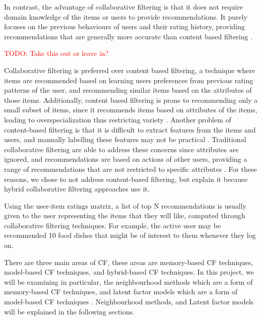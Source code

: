 In contrast, the advantage of collaborative filtering is that it does not require domain knowledge of the items or users to provide recommendations. It purely focuses on the previous behaviours of users and their rating history, providing recommendations that are generally more accurate than content based filtering \cite{koren2009matrix, schafer2007collaborative}. 

\textcolor{red}{TODO: Take this out or leave in?}

Collaborative filtering is preferred over content based filtering, a technique where items are recommended based on learning users preferences from previous rating patterns of the user, and recommending similar items based on the attributes of those items. Additionally, content based filtering is prone to recommending only a small subset of items, since it recommends items based on attributes of the items, leading to overspecialization thus restricting variety \cite{toward}. Another problem of content-based filtering is that it is difficult to extract features from the items and users, and manually labelling these features may not be practical \cite{toward}. Traditional collaborative filtering are able to address these concerns since attributes are ignored, and recommendations are based on actions of other users, providing a range of recommendations that are not restricted to specific attributes \cite{koren2009matrix}. For these reasons, we chose to not address content-based filtering, but explain it because hybrid collaborative filtering approaches use it. 

Using the user-item ratings matrix, a list of top N recommendations is usually given to the user representing the items that they will like, computed through collaborative filtering techniques. For example, the active user may be recommended 10 food dishes that might be of interest to them whenever they log on.  

There are three main areas of CF, these areas are memory-based CF techniques, model-based CF techniques, and hybrid-based CF techniques. In this project, we will be examining in particular, the neighbourhood methods which are a form of memory-based CF techniques, and latent factor models which are a form of model-based CF techniques \cite{survey, koren2009matrix}. Neighbourhood methods, and Latent factor models will be explained in the following sections. 

